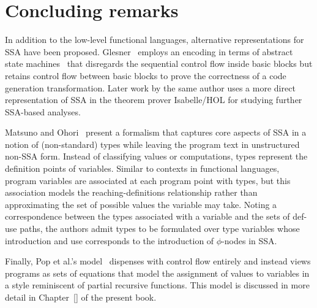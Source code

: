 
\section{Concluding remarks}
\label{section:Part1:Semantics:Conclusion}
In addition to the low-level functional languages, alternative
representations for SSA have been proposed.
Glesner~\cite{DBLP:conf/asm/Glesner04} employs an encoding in terms of
abstract state machines~\cite{DBLP:journals/tocl/Gurevich00} that
disregards the sequential control flow inside basic blocks but retains
control flow between basic blocks to prove the correctness of a code
generation transformation. Later work by the same author uses a more
direct representation of SSA in the theorem prover Isabelle/HOL for
studying further SSA-based analyses.

Matsuno and Ohori~\cite{DBLP:conf/ppdp/MatsunoO06} present a formalism
that captures core aspects of SSA in a notion of (non-standard) types
while leaving the program text in unstructured non-SSA form. Instead
of classifying values or computations, types represent the definition
points of variables.  Similar to contexts in functional languages,
program variables are associated at each program point with types, but
this association models the reaching-definitions relationship rather
than approximating the set of possible values the variable may take.
Noting a correspondence between the types associated with a variable
and the sets of def-use paths, the authors admit types to be
formulated over type variables whose introduction and use corresponds
to the introduction of $\phi$-nodes in SSA.

Finally, Pop et al.'s model~\cite{PopJS2007} dispenses with control
flow entirely and instead views programs as sets of equations that
model the assignment of values to variables in a style reminiscent of
partial recursive functions. This model is discussed in more detail in
Chapter~\ref{} of the present book.


